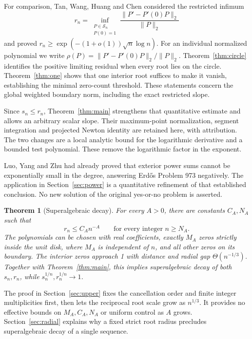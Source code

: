 \documentclass[11pt]{article}
\newtheorem{theorem}{Theorem}
\theoremstyle{remark}\newtheorem{remark}[theorem]{Remark}
\newcommand{\norm}[1]{\lVert #1\rVert}
\begin{document}
For comparison, Tan, Wang, Huang and Chen \cite[Theorem 1.1]{tan}
considered the restricted infimum
\[
 r_n=\inf_{\substack{P\in\mathcal S_n\\P(0)=1}}
       \frac{\norm{P'-P'(0)P}_2}{\norm P_2}
\]
and proved \(r_n\ge\exp(-(1+o(1))\sqrt n\log n)\).
For an individual normalized polynomial we write
\(\rho(P)=\norm{P'-P'(0)P}_2/\norm P_2\).
Theorem~\ref{thm:circle} identifies the positive limiting residual
when every root lies on the circle. Theorem~\ref{thm:one} shows
that one interior root suffices to make it vanish, establishing the
minimal zero-count threshold. These statements
concern the global weighted boundary norm, including the exact
restricted slope.

Since \(s_n\le r_n\), Theorem~\ref{thm:main} strengthens that quantitative
estimate and allows an arbitrary scalar slope.
Their maximum-point normalization, segment integration and projected
Newton identity are retained here, with attribution. The two changes
are a local analytic bound for the logarithmic derivative and a bounded
test polynomial. These remove the logarithmic factor in the exponent.

Luo, Yang and Zhu \cite[Theorem 1.1]{luo} had already proved that exterior
power sums cannot be exponentially small in the degree, answering
Erd\H{o}s Problem 973 negatively. The application in Section~\ref{sec:power}
is a quantitative refinement of that established conclusion.
No new solution of the original yes-or-no problem is asserted.

\begin{theorem}[Superalgebraic decay]\label{thm:upper}
For every \(A>0\), there are constants \(C_A,N_A\) such that
\[
 r_n\le C_A n^{-A}\qquad\text{for every integer }n\ge N_A.
\]
The polynomials can be chosen with real coefficients, exactly
\(M_A\) zeros strictly inside the unit disk, where \(M_A\) is
independent of \(n\), and all other zeros on its boundary.
The interior zeros approach 1 with distance and radial gap
\(\Theta(n^{-1/3})\). Together with
Theorem~\ref{thm:main}, this implies superalgebraic decay of both
\(s_n,r_n\), while \(s_n^{1/n},r_n^{1/n}\to1\).
\end{theorem}

The proof in Section~\ref{sec:upper} fixes the cancellation order
and finite integer multiplicities first, then lets the reciprocal root
scale grow as \(n^{1/3}\). It provides no effective bounds on
\(M_A,C_A,N_A\) or uniform control as \(A\) grows.
Section~\ref{sec:radial} explains why a fixed strict root radius
precludes superalgebraic decay of a single sequence.
\end{document}
